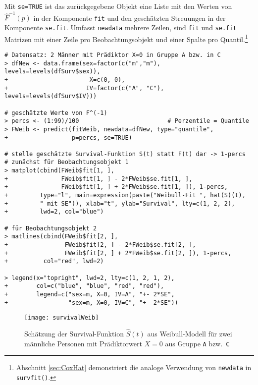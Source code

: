 Mit \lstinline!se=TRUE! ist das zurückgegebene Objekt eine Liste mit den Werten von $\hat{F}^{-1}(p)$ in der Komponente \lstinline!fit! und den geschätzten Streuungen in der Komponente \lstinline!se.fit!. Umfasst \lstinline!newdata! mehrere Zeilen, sind \lstinline!fit! und \lstinline!se.fit! Matrizen mit einer Zeile pro Beobachtungsobjekt und einer Spalte pro Quantil.\footnote{Abschnitt \ref{sec:CoxHat} demonstriert die analoge Verwendung von \lstinline!newdata! in \lstinline!survfit()!.}
\begin{lstlisting}
# Datensatz: 2 Männer mit Prädiktor X=0 in Gruppe A bzw. in C
> dfNew <- data.frame(sex=factor(c("m","m"), levels=levels(dfSurv$sex)),
+                       X=c(0, 0),
+                      IV=factor(c("A", "C"), levels=levels(dfSurv$IV)))

# geschätzte Werte von F^(-1)
> percs <- (1:99)/100                         # Perzentile = Quantile
> FWeib <- predict(fitWeib, newdata=dfNew, type="quantile",
+                  p=percs, se=TRUE)

# stelle geschätzte Survival-Funktion S(t) statt F(t) dar -> 1-percs
# zunächst für Beobachtungsobjekt 1
> matplot(cbind(FWeib$fit[1, ],
+               FWeib$fit[1, ] - 2*FWeib$se.fit[1, ],
+               FWeib$fit[1, ] + 2*FWeib$se.fit[1, ]), 1-percs,
+         type="l", main=expression(paste("Weibull-Fit ", hat(S)(t),
+         " mit SE")), xlab="t", ylab="Survival", lty=c(1, 2, 2),
+         lwd=2, col="blue")

# für Beobachtungsobjekt 2
> matlines(cbind(FWeib$fit[2, ],
+                FWeib$fit[2, ] - 2*FWeib$se.fit[2, ],
+                FWeib$fit[2, ] + 2*FWeib$se.fit[2, ]), 1-percs,
+          col="red", lwd=2)

> legend(x="topright", lwd=2, lty=c(1, 2, 1, 2),
+        col=c("blue", "blue", "red", "red"),
+        legend=c("sex=m, X=0, IV=A", "+- 2*SE",
+                 "sex=m, X=0, IV=C", "+- 2*SE"))
\end{lstlisting}

\begin{figure}[ht]
\centering
\texttt{[image: survivalWeib]}
\vspace*{-1em}
\caption{Schätzung der Survival-Funktion $\hat{S}(t)$ aus Weibull-Modell für zwei männliche Personen mit Prädiktorwert $X=0$ aus Gruppe \lstinline!A! bzw.\ \lstinline!C!}
\label{fig:survivalWeib}
\end{figure}
